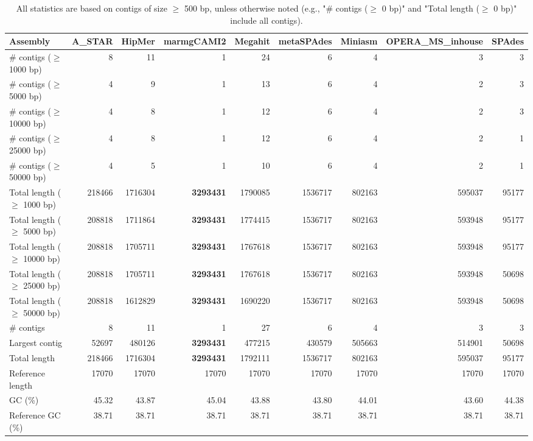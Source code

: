 \documentclass[12pt,a4paper]{article}
\begin{document}
\begin{table}[ht]
\begin{center}
\caption{All statistics are based on contigs of size $\geq$ 500 bp, unless otherwise noted (e.g., "\# contigs ($\geq$ 0 bp)" and "Total length ($\geq$ 0 bp)" include all contigs).}
\begin{tabular}{|l*{8}{|r}|}
\hline
Assembly & A\_STAR & HipMer & marmgCAMI2 & Megahit & metaSPAdes & Miniasm & OPERA\_MS\_inhouse & SPAdes \\ \hline
\# contigs ($\geq$ 1000 bp) & 8 & 11 & 1 & 24 & 6 & 4 & 3 & 3 \\ \hline
\# contigs ($\geq$ 5000 bp) & 4 & 9 & 1 & 13 & 6 & 4 & 2 & 3 \\ \hline
\# contigs ($\geq$ 10000 bp) & 4 & 8 & 1 & 12 & 6 & 4 & 2 & 3 \\ \hline
\# contigs ($\geq$ 25000 bp) & 4 & 8 & 1 & 12 & 6 & 4 & 2 & 1 \\ \hline
\# contigs ($\geq$ 50000 bp) & 4 & 5 & 1 & 10 & 6 & 4 & 2 & 1 \\ \hline
Total length ($\geq$ 1000 bp) & 218466 & 1716304 & {\bf 3293431} & 1790085 & 1536717 & 802163 & 595037 & 95177 \\ \hline
Total length ($\geq$ 5000 bp) & 208818 & 1711864 & {\bf 3293431} & 1774415 & 1536717 & 802163 & 593948 & 95177 \\ \hline
Total length ($\geq$ 10000 bp) & 208818 & 1705711 & {\bf 3293431} & 1767618 & 1536717 & 802163 & 593948 & 95177 \\ \hline
Total length ($\geq$ 25000 bp) & 208818 & 1705711 & {\bf 3293431} & 1767618 & 1536717 & 802163 & 593948 & 50698 \\ \hline
Total length ($\geq$ 50000 bp) & 208818 & 1612829 & {\bf 3293431} & 1690220 & 1536717 & 802163 & 593948 & 50698 \\ \hline
\# contigs & 8 & 11 & 1 & 27 & 6 & 4 & 3 & 3 \\ \hline
Largest contig & 52697 & 480126 & {\bf 3293431} & 477215 & 430579 & 505663 & 514901 & 50698 \\ \hline
Total length & 218466 & 1716304 & {\bf 3293431} & 1792111 & 1536717 & 802163 & 595037 & 95177 \\ \hline
Reference length & 17070 & 17070 & 17070 & 17070 & 17070 & 17070 & 17070 & 17070 \\ \hline
GC (\%) & 45.32 & 43.87 & 45.04 & 43.88 & 43.80 & 44.01 & 43.60 & 44.38 \\ \hline
Reference GC (\%) & 38.71 & 38.71 & 38.71 & 38.71 & 38.71 & 38.71 & 38.71 & 38.71 \\ \hline

\end{tabular}
\end{center}
\end{table}
\end{document}
